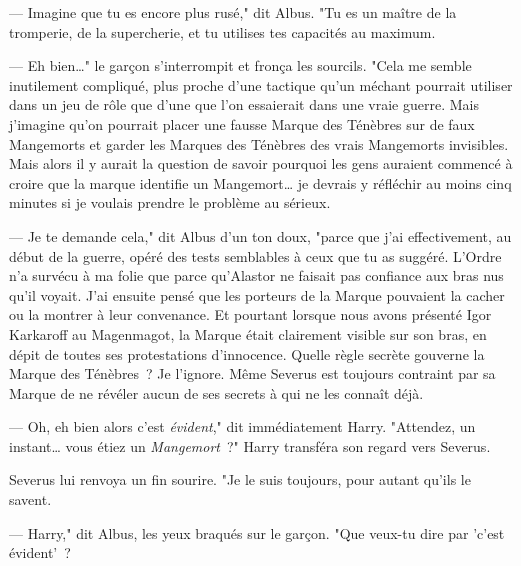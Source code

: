 --- Imagine que tu es encore plus rusé," dit Albus. "Tu es un maître de la tromperie, de la supercherie, et tu utilises tes capacités au maximum.

--- Eh bien…" le garçon s'interrompit et fronça les sourcils. "Cela me semble inutilement compliqué, plus proche d'une tactique qu'un méchant pourrait utiliser dans un jeu de rôle que d'une que l'on essaierait dans une vraie guerre. Mais j'imagine qu'on pourrait placer une fausse Marque des Ténèbres sur de faux Mangemorts et garder les Marques des Ténèbres des vrais Mangemorts invisibles. Mais alors il y aurait la question de savoir pourquoi les gens auraient commencé à croire que la marque identifie un Mangemort… je devrais y réfléchir au moins cinq minutes si je voulais prendre le problème au sérieux.

--- Je te demande cela," dit Albus d'un ton doux, "parce que j'ai effectivement, au début de la guerre, opéré des tests semblables à ceux que tu as suggéré. L'Ordre n'a survécu à ma folie que parce qu'Alastor ne faisait pas confiance aux bras nus qu'il voyait. J'ai ensuite pensé que les porteurs de la Marque pouvaient la cacher ou la montrer à leur convenance. Et pourtant lorsque nous avons présenté Igor Karkaroff au Magenmagot, la Marque était clairement visible sur son bras, en dépit de toutes ses protestations d'innocence. Quelle règle secrète gouverne la Marque des Ténèbres~? Je l'ignore. Même Severus est toujours contraint par sa Marque de ne révéler aucun de ses secrets à qui ne les connaît déjà.

--- Oh, eh bien alors c'est \emph{évident}," dit immédiatement Harry. "Attendez, un instant… vous étiez un \emph{Mangemort}~?" Harry transféra son regard vers Severus.

Severus lui renvoya un fin sourire. "Je le suis toujours, pour autant qu'ils le savent.

--- Harry," dit Albus, les yeux braqués sur le garçon. "Que veux-tu dire par 'c'est évident'~?

